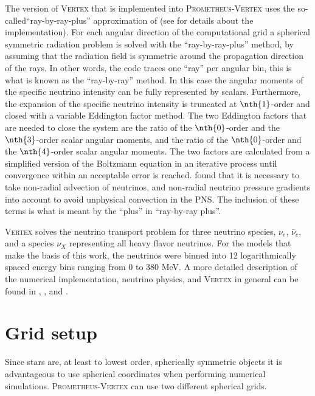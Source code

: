 The version of \textsc{Vertex} that is implemented into \textsc{Prometheus-Vertex} uses
the so-called``ray-by-ray-plus'' approximation of \cite{buras_06a} (see \cite{hanke_phd} for details about the implementation).
For each angular direction of the computational grid a spherical symmetric radiation problem is solved
with the ``ray-by-ray-plus'' method, by assuming that the radiation field is symmetric around the propagation direction of the rays.
In other words, the code traces one ``ray'' per angular bin, this is what is known as the ``ray-by-ray'' method.
In this case the angular moments of the specific neutrino intensity can be fully represented by scalars.
Furthermore, the expansion of the specific neutrino intensity is truncated at $\nth{1}$-order and
closed with a variable Eddington factor method. The two Eddington factors that are needed to close the system are the ratio of
the $\nth{0}$-order and the $\nth{3}$-order scalar angular moments, and the ratio of the $\nth{0}$-order and the $\nth{4}$-order scalar angular moments. 
The two factors are calculated from a simplified version of the Boltzmann equation in an iterative process until convergence within an acceptable error is reached. 
\cite{buras_06b} found that it is necessary to take non-radial advection of neutrinos, and 
non-radial neutrino pressure gradients into account to avoid unphysical convection in the PNS. 
The inclusion of these terms is what is meant by the ``plus'' in ``ray-by-ray plus''.

\textsc{Vertex} solves the neutrino transport problem for three neutrino species, $\nu_e$, $\bar{\nu}_e$, and a species $\nu_X$ representing
all heavy flavor neutrinos. 
For the models that make the basis of this work, the neutrinos were binned into 12 logarithmically spaced energy bins ranging from 0 to 380 MeV.  
A more detailed description of the numerical implementation, neutrino physics, and \textsc{Vertex} in general can
be found in \cite{rampp_02}, \cite{hanke_phd}, and \cite{melson_phd}.

\section{Grid setup}
Since stars are, at least to lowest order, spherically symmetric objects it is advantageous to use spherical coordinates when performing numerical simulations.
\textsc{Prometheus-Vertex} can use two different spherical grids.

